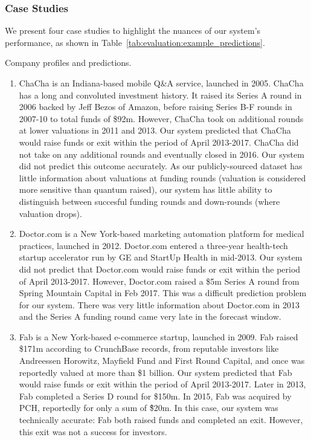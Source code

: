 \documentclass[../thesis/thesis.tex]{subfiles}
\begin{document}
\subsubsection{Case Studies}

We present four case studies to highlight the nuances of our system's performance, as shown in Table~\ref{tab:evaluation:example_predictions}.

\begin{table}[!htb]
    \centering
    \scalebox{0.9}{}
    \caption[Company profiles and predictions]{Company profiles and predictions.}
    \label{tab:evaluation:example_predictions}
\end{table}

\begin{enumerate}

\item ChaCha is an Indiana-based mobile Q\&A service, launched in 2005. ChaCha has a long and convoluted investment history. It raised its Series A round in 2006 backed by Jeff Bezos of Amazon, before raising Series B-F rounds in 2007-10 to total funds of \$92m. However, ChaCha took on additional rounds at lower valuations in 2011 and 2013. Our system predicted that ChaCha would raise funds or exit within the period of April 2013-2017. ChaCha did not take on any additional rounds and eventually closed in 2016. Our system did not predict this outcome accurately. As our publicly-sourced dataset has little information about valuations at funding rounds (valuation is considered more sensitive than quantum raised), our system has little ability to distinguish between succesful funding rounds and down-rounds (where valuation drops).

\item Doctor.com is a New York-based marketing automation platform for medical practices, launched in 2012. Doctor.com entered a three-year health-tech startup accelerator run by GE and StartUp Health in mid-2013. Our system did not predict that Doctor.com would raise funds or exit within the period of April 2013-2017. However, Doctor.com raised a \$5m Series A round from Spring Mountain Capital in Feb 2017. This was a difficult prediction problem for our system. There was very little information about Doctor.com in 2013 and the Series A funding round came very late in the forecast window.

\item Fab is a New York-based e-commerce startup, launched in 2009. Fab raised \$171m according to CrunchBase records, from reputable investors like Andreessen Horowitz, Mayfield Fund and First Round Capital, and once was reportedly valued at more than \$1 billion. Our system predicted that Fab would raise funds or exit within the period of April 2013-2017. Later in 2013, Fab completed a Series D round for \$150m. In 2015, Fab was acquired by PCH, reportedly for only a sum of \~\$20m. In this case, our system was technically accurate: Fab both raised funds and completed an exit. However, this exit was not a success for investors.


\end{enumerate}
\end{document}
